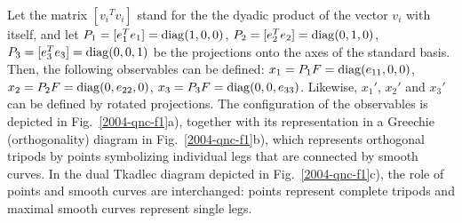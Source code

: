 \documentclass[pra,showpacs,showkeys,amsfonts]{revtex4}
\begin{document}
Let
the matrix $[{ v_i}^T{ v_i}]$
stand for the the dyadic product
of the vector ${ v_i}$ with itself, and let
$P_1=[e_1^T e_1]={\rm diag}(1,0,0)$,
$P_2=[e_2^T e_2]={\rm diag}(0,1,0)$,
$P_3=[e_3^T e_3]={\rm diag}(0,0,1)$ be the projections
onto the  axes of the  standard basis.
Then, the following observables can be defined:
$x_1=P_1F={\rm diag}(e_{11},0,0)$,
$x_2=P_2F={\rm diag}(0,e_{22},0)$,
$x_3=P_3F={\rm diag}(0,0,e_{33})$.
Likewise, $x_1'$, $x_2'$ and $x_3'$ can be defined
by  rotated projections.
The configuration of the observables
is depicted in Fig.~\ref{2004-qnc-f1}a), together with
its representation in a Greechie (orthogonality) diagram \cite{greechie:71}
in Fig.~\ref{2004-qnc-f1}b),
which represents orthogonal tripods by points symbolizing individual legs that are connected by smooth curves.
In the dual Tkadlec diagram depicted in Fig.~\ref{2004-qnc-f1}c), the role of points and
smooth curves are interchanged: points represent complete tripods and maximal smooth curves represent
single legs.
\end{document}
